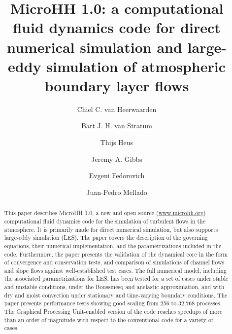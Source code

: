 \documentclass[gmd,manuscript]{copernicus}
\begin{document}
\linenumbers

\title{MicroHH 1.0: a computational fluid dynamics code for direct numerical simulation and large-eddy simulation of atmospheric boundary layer flows}

\author[1,2]{Chiel C. van Heerwaarden}
\author[1,2]{Bart J. H. van Stratum}
\author[3]{Thijs Heus}
\author[4]{Jeremy A. Gibbs}
\author[5]{Evgeni Fedorovich}
\author[2]{Juan-Pedro Mellado}






\received{}
\pubdiscuss{} %
\revised{}
\accepted{}
\published{}



\maketitle  %

\begin{abstract}
This paper describes MicroHH 1.0, a new and open source (\url{www.microhh.org}) computational fluid dynamics code for the simulation of turbulent flows in the atmosphere. It is primarily made for direct numerical simulation, but also supports large-eddy simulation (LES). The paper covers the description of the governing equations, their numerical implementation, and the parametrizations included in the code. Furthermore, the paper presents the validation of the dynamical core in the form of convergence and conservation tests, and comparison of simulations of channel flows and slope flows against well-established test cases. The full numerical model, including the associated parametrizations for LES, has been tested for a set of cases under stable and unstable conditions, under the Boussinesq and anelastic approximation, and with dry and moist convection under stationary and time-varying boundary conditions. The paper presents performance tests showing good scaling from 256 to 32,768 processes. The Graphical Processing Unit-enabled version of the code reaches speedups of more than an order of magnitude with respect to the conventional code for a variety of cases.
\end{abstract}
\end{document}
